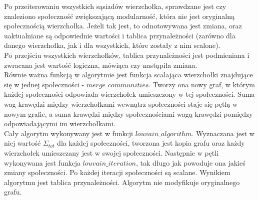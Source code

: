\documentclass{article}
\begin{document}
Po przeiterowaniu wszystkich sąsiadów wierzchołka, sprawdzane jest czy znaleziono społeczność zwiększającą modularność, która nie jest oryginalną społecznością wierzchołka. Jeżeli tak jest, to odnotowywana jest zmiana, oraz uaktualniane są odpowiednie wartości i tablica przynależności (zarówno dla danego wierzchołka, jak i dla wszystkich, które zostały z nim scalone).\\

Po przejściu wszystkich wierzchołków, tablica przynależności jest podmieniana i zwracana jest wartość logiczna, mówiąca czy nastąpiła zmiana.\\

Równie ważna funkcją w algorytmie jest funkcja scalająca wierzchołki znajdujące się w jednej społeczności - $merge\_ communities$. Tworzy ona nowy graf, w którym każdej społeczności odpowiada wierzchołek umieszczony w tej społeczności. Suma wag krawędzi między wierzchołkami wewnątrz społeczności staje się pętlą w nowym grafie, a suma krawędzi między społecznościami wagą krawędzi pomiędzy odpowiadającymi im wierzchołkami.\\

Cały algorytm wykonywany jest w funkcji $louvain\_ algorithm$. Wyznaczana jest w niej wartość $\Sigma_{tot}$ dla każdej społeczności, tworzona jest kopia grafu oraz każdy wierzchołek umieszczany jest w swojej społeczności. Następnie w pętli wykonywana jest funkcja $louvain\_ iteration$, tak długo jak powoduje ona jakieś zmiany społeczności. Po każdej iteracji społeczności są scalane. Wynikiem algorytmu jest tablica przynależności. Algorytm nie modyfikuje oryginalnego grafu.
\end{document}
